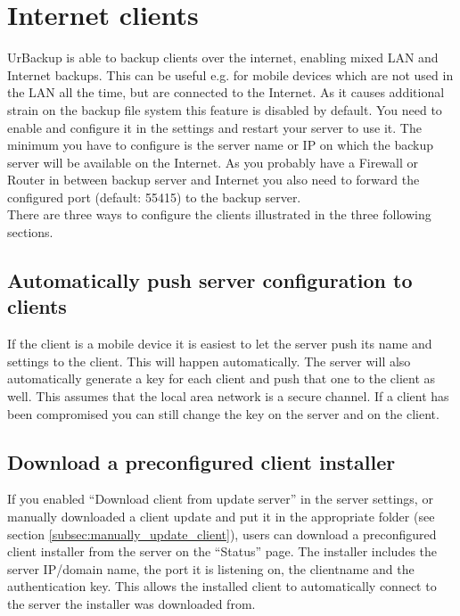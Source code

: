 \documentclass[a4paper,10pt]{article}
\begin{document}
\section{Internet clients}
\label{sec:internet_clients}

UrBackup is able to backup clients over the internet, enabling mixed LAN and
Internet backups. This can be useful e.g. for mobile devices which are not
used in the LAN all the time, but are connected to the Internet. As it causes
additional strain on the backup file system this feature is disabled by default.
You need to enable and configure it in the settings and restart your server to
use it. The minimum you have to configure is the server name or IP on which
the backup server will be available on the Internet. As you probably have a
Firewall or Router in between backup server and Internet you also need to forward
the configured port (default: 55415) to the backup server.\\
There are three ways to configure the clients illustrated in the three following sections.

\subsection{Automatically push server configuration to clients}

If the client is a mobile device it is easiest to let the server push its name and
settings to the client. This will happen automatically. The server will also automatically
generate a key for each client and push that one to the client as well. This assumes that
the local area network is a secure channel. If a client has been compromised you can still
change the key on the server and on the client.

\subsection{Download a preconfigured client installer}

If you enabled ``Download client from update server'' in the server settings, or manually
downloaded a client update and put it in the appropriate folder (see section \ref{subsec:manually_update_client}),
users can download a preconfigured client installer from the server on the ``Status'' page.
The installer includes the server IP/domain name, the port it is listening on, the clientname and the authentication key.
This allows the installed client to automatically connect to the server the installer was downloaded from.
\end{document}
